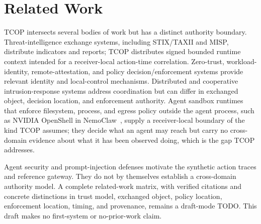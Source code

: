 \section{Related Work}

TCOP intersects several bodies of work but has a distinct authority boundary. Threat-intelligence exchange systems, including STIX/TAXII and MISP, distribute indicators and reports; TCOP distributes signed bounded runtime context intended for a receiver-local action-time correlation. Zero-trust, workload-identity, remote-attestation, and policy decision/enforcement systems provide relevant identity and local-control mechanisms. Distributed and cooperative intrusion-response systems address coordination but can differ in exchanged object, decision location, and enforcement authority. Agent sandbox runtimes that enforce filesystem, process, and egress policy outside the agent process, such as NVIDIA OpenShell in NemoClaw~\cite{nemoclaw-2026}, supply a receiver-local boundary of the kind TCOP assumes; they decide what an agent may reach but carry no cross-domain evidence about what it has been observed doing, which is the gap TCOP addresses.

Agent security and prompt-injection defenses motivate the synthetic action traces and reference gateway. They do not by themselves establish a cross-domain authority model. A complete related-work matrix, with verified citations and concrete distinctions in trust model, exchanged object, policy location, enforcement location, timing, and provenance, remains a draft-mode TODO. This draft makes no first-system or no-prior-work claim.


